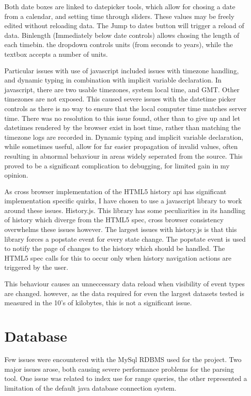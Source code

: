 Both date boxes are linked to datepicker tools, which allow for chosing a date from a calendar, and setting time through sliders. These values may be freely edited without reloading data. The Jump to dates button will trigger a reload of data. 
Binlength (Immediately below date controls) allows chosing the length of each timebin. the dropdown controls units (from seconds to years), while the textbox accepts a number of units.

Particular issues with use of javascript included issues with timezone handling, and dynamic typing in combination with implicit variable declaration. In javascript, there are two usable timezones, system local time, and GMT. Other timezones are not exposed. This caused severe issues with the datetime picker controls as there is no way to ensure that the local computer time matches server time. There was no resolution to this issue found, other than to give up and let datetimes rendered by the browser exist in host time, rather than matching the timezone logs are recorded in. 
Dynamic typing and implicit variable declaration, while sometimes useful, allow for far easier propagation of invalid values, often resulting in abnormal behaviour in areas widely seperated from the source. This proved to be a significant complication to debugging, for limited gain in my opinion. 

As cross browser implementation of the HTML5 history api has significant implementation specific quirks, I have chosen to use a javascript library to work around these issues. History.js. This library has some peculiarities in its handling of history which diverge from the HTML5 spec, cross browser consistency overwhelms these issues however.  The largest issues with history.js is that this library forces a popstate event for every state change. The popstate event is used to notify the page of changes to the history which should be handled. The HTML5 spec calls for this to occur only when history navigation actions are triggered by the user.

This behaviour causes an unneccessary data reload when visibility of event types are changed. however, as the data required for even the largest datasets tested is measured in the 10's of kilobytes, this is not a significant issue. 

\section{Database}\label{imp_db}
Few issues were encountered with the MySql RDBMS used for the project. Two major issues arose, both causing severe performance problems for the parsing tool. One issue was related to index use for range queries, the other represented a limitation of the default java database connection system. 

